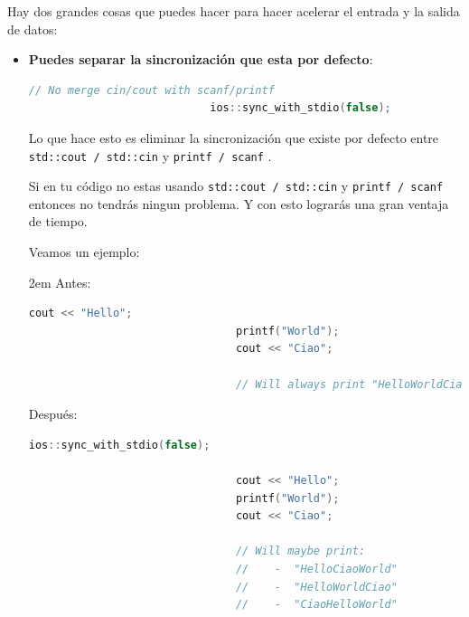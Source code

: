 \documentclass[12pt, fleqn]{report}                             %
\newenvironment{Indentation}[1][0.75em]                         %
        {\begin{adjustwidth}{#1}{}}                                 %
        {\end{adjustwidth}}                                         %
\theoremstyle{break}                                            %
\newcommand{\textCode}[1]  { \texttt{#1} }                      %
\begin{document}
                Hay dos grandes cosas que puedes hacer para hacer acelerar el entrada y la salida
                de datos:
                \begin{itemize}
                    \item \textbf{Puedes separar la sincronización que esta por defecto}:
                        \begin{lstlisting}[language=C++, gobble=28]
                            // No merge cin/cout with scanf/printf
                            ios::sync_with_stdio(false);   
                        \end{lstlisting}

                        Lo que hace esto es eliminar la sincronización que existe por defecto entre 
                        \textCode{std::cout / std::cin} y \textCode{printf / scanf}. 
                        
                        Si en tu código no estas usando \textCode{std::cout / std::cin} y \textCode{printf / scanf}
                        entonces no tendrás ningun problema. Y con esto lograrás una gran ventaja de tiempo.

                        Veamos un ejemplo:

                        \begin{Indentation}[2em] 
                            Antes:
                            \begin{lstlisting}[language=C++, gobble=32]
                                cout << "Hello";
                                printf("World");
                                cout << "Ciao";  

                                // Will always print "HelloWorldCiao"
                            \end{lstlisting}

                            Después:
                            \begin{lstlisting}[language=C++, gobble=32]
                                ios::sync_with_stdio(false);   

                                cout << "Hello";
                                printf("World");
                                cout << "Ciao";  

                                // Will maybe print:
                                //    -  "HelloCiaoWorld"
                                //    -  "HelloWorldCiao"
                                //    -  "CiaoHelloWorld"
                            \end{lstlisting}
                        \end{Indentation}


\end{itemize}
\end{document}
